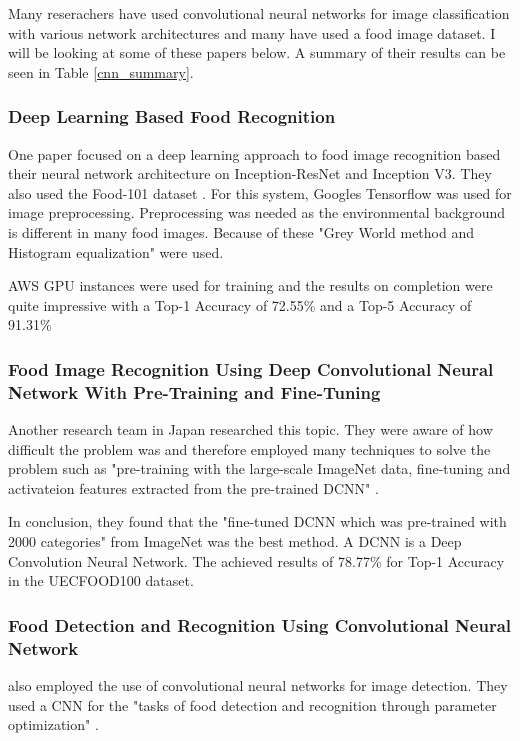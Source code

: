 Many reserachers have used convolutional neural networks for image
classification with various network architectures and many have used a food image dataset.
I will be looking at some of these papers below.
A summary of their results can be seen in Table \ref{cnn_summary}.

\subsubsection*{Deep Learning Based Food Recognition}
One paper focused on a deep learning approach to food image recognition based
their neural network architecture on Inception-ResNet and Inception V3. They
also used the Food-101 dataset \textcite{deepLearning}. For this system, Googles
Tensorflow was used for image preprocessing. Preprocessing was needed as the
environmental background is different in many food images. Because of these
"Grey World method and Histogram equalization" \textcite{deepLearning} were
used.

AWS GPU instances were used for training and the results on completion were
quite impressive with a Top-1 Accuracy of 72.55\% and a Top-5 Accuracy of
91.31\% \textcite{deepLearning}

\subsubsection*{Food Image Recognition Using Deep Convolutional Neural Network
With Pre-Training and Fine-Tuning}
Another research team in Japan researched this topic. They were aware of how
difficult the problem was and therefore employed many techniques to solve the
problem such as "pre-training with the large-scale ImageNet data, fine-tuning
and activateion features extracted from the pre-trained DCNN"
\textcite{yanaiFood}. 

In conclusion, they found that the "fine-tuned DCNN which was pre-trained
with 2000 categories" \textcite{yanaiFood} from ImageNet was the best method. A
DCNN is a Deep Convolution Neural Network. The achieved results of 78.77\% for
Top-1 Accuracy in the UECFOOD100 dataset.

\subsubsection*{Food Detection and Recognition Using Convolutional Neural Network}
\textcite{kagayaFood} also employed the use of convolutional neural networks for
image detection. They used a CNN for the "tasks of food detection and recognition
through parameter optimization" \textcite{kagayaFood}.

